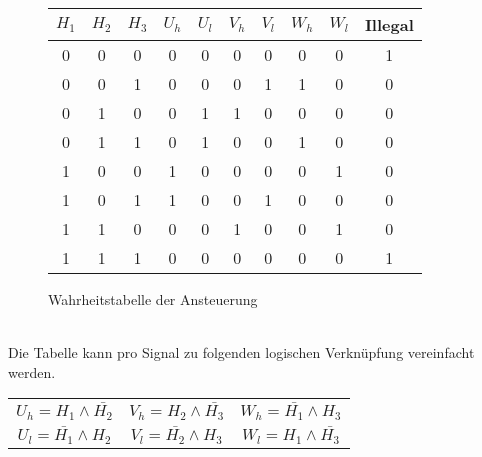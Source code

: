 \begin{figure}[h!]
\begin{tabular}{ccc||cc|cc|cc||c}
     $H_1$ & $H_2$ & $H_3$ & $U_h$ & $U_l$ & $V_h$ & $V_l$ & $W_h$ & $W_l$ & Illegal\\
\hline 0   &   0   &   0   &   0   &   0   &   0   &   0   &   0   &   0   &   1\\
       0   &   0   &   1   &   0   &   0   &   0   &   1   &   1   &   0   &   0\\
       0   &   1   &   0   &   0   &   1   &   1   &   0   &   0   &   0   &   0\\
       0   &   1   &   1   &   0   &   1   &   0   &   0   &   1   &   0   &   0\\
       1   &   0   &   0   &   1   &   0   &   0   &   0   &   0   &   1   &   0\\
       1   &   0   &   1   &   1   &   0   &   0   &   1   &   0   &   0   &   0\\
       1   &   1   &   0   &   0   &   0   &   1   &   0   &   0   &   1   &   0\\
       1   &   1   &   1   &   0   &   0   &   0   &   0   &   0   &   0   &   1\\
\end{tabular}
	\centering
	\caption{Wahrheitstabelle der Ansteuerung} 
\label{abb:WahrheitstabelleAnsteuerung}
\end{figure}\\
Die Tabelle kann pro Signal zu folgenden logischen Verknüpfung vereinfacht werden.\\
\begin{tabular}{ccc}
$U_h = H_1 \wedge \bar{H_2}$ & $V_h = H_2 \wedge \bar{H_3}$ & $W_h = \bar{H_1} \wedge H_3$\\
$U_l = \bar{H_1} \wedge H_2$ & $V_l = \bar{H_2} \wedge H_3$ & $W_l = H_1 \wedge \bar{H_3}$
\end{tabular}
